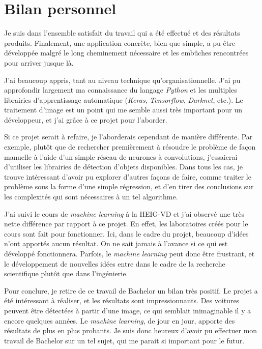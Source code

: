 \section{Bilan personnel}

Je suis dans l'ensemble satisfait du travail qui a été effectué et des résultats produits. Finalement, une application concrète, bien que simple, a pu être développée malgré le long cheminement nécessaire et les embûches rencontrées pour arriver jusque là. 

J'ai beaucoup appris, tant au niveau technique qu'organisationnelle. J'ai pu approfondir largement ma connaissance du langage \textit{Python} et les multiples librairies d'apprentissage automatique (\textit{Keras}, \textit{Tensorflow}, \textit{Darknet}, etc.). Le traitement d'image est un point qui me semble aussi très important pour un développeur, et j'ai grâce à ce projet pour l'aborder.

Si ce projet serait à refaire, je l'aborderais cependant de manière différente. Par exemple, plutôt que de rechercher premièrement à résoudre le problème de façon manuelle à l'aide d'un simple réseau de neurones à convolutions, j'essaierai d'utiliser les librairies de détection d'objets disponibles. Dans tous les cas, je trouve intéressant d'avoir pu explorer d'autres façons de faire, comme traiter le problème sous la forme d'une simple régression, et d'en tirer des conclusions sur les complexités qui sont nécessaires à un tel algorithme. 

J'ai suivi le cours de \textit{machine learning} à la HEIG-VD et j'ai observé une très nette différence par rapport à ce projet. En effet, les laboratoires créés pour le cours sont fait pour fonctionner. Ici, dans le cadre du projet, beaucoup d'idées n'ont apportés aucun résultat. On ne sait jamais à l'avance si ce qui est développé fonctionnera. Parfois, le \textit{machine learning} peut donc être frustrant, et le développement de nouvelles idées entre dans le cadre de la recherche scientifique plutôt que dans l'ingénierie. 

Pour conclure, je retire de ce travail de Bachelor un bilan très positif. Le projet a été intéressant à réaliser, et les résultats sont impressionnants. Des voitures peuvent être détectées à partir d'une image, ce qui semblait inimaginable il y a encore quelques années. Le \textit{machine learning}, de jour en jour, apporte des résultats de plus en plus probants. Je suis donc heureux d'avoir pu effectuer mon travail de Bachelor sur un tel sujet, qui me parait si important pour le futur.